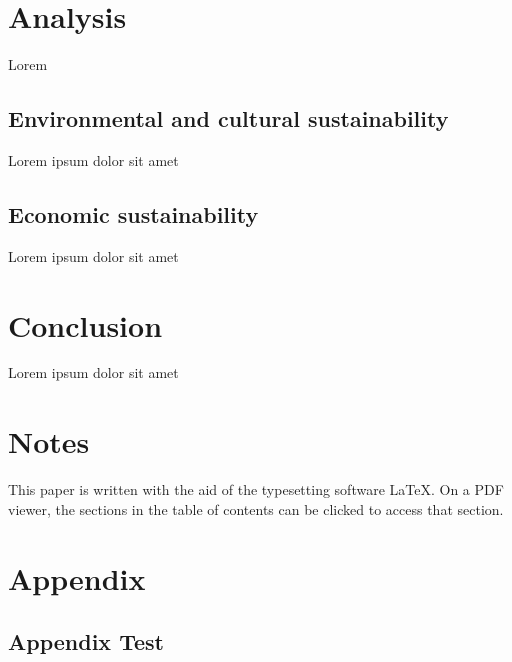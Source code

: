 \documentclass[11pt,letterpaper]{article}
\begin{document}
\section{Analysis}

Lorem

\subsection{Environmental and cultural sustainability}
Lorem ipsum dolor sit amet

\subsection{Economic sustainability}
Lorem ipsum dolor sit amet

\section{Conclusion}

Lorem ipsum dolor sit amet

\newpage
{}


\section*{Notes}
\label{sec:notes}

This paper is written with the aid of the typesetting software \LaTeX. On a PDF viewer, the sections in the table of contents can be clicked to access that section.

\printbibliography[heading=bibintoc, title=Works Cited]

\appendix
\section{Appendix}
\label{app}

\subsection{Appendix Test}
\label{app:test}
\end{document}
